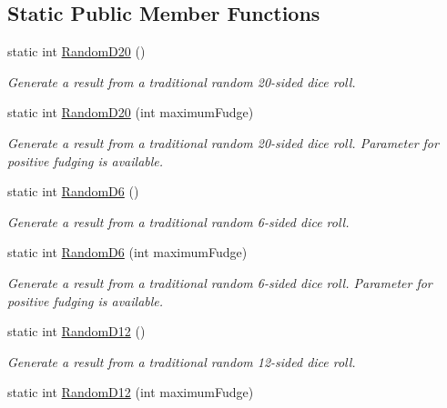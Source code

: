 \subsection*{Static Public Member Functions}
\begin{DoxyCompactItemize}
\item 
static int \mbox{\hyperlink{class_bigfoot_d_s_1_1_bigfoot_dice_and_coins_aad9d7b91f049e912555cb199bc66d0d7}{Random\+D20}} ()
\begin{DoxyCompactList}\small\item\em Generate a result from a traditional random 20-\/sided dice roll. \end{DoxyCompactList}\item 
static int \mbox{\hyperlink{class_bigfoot_d_s_1_1_bigfoot_dice_and_coins_a7ad023ef095ad98f7d38c5b0234f2555}{Random\+D20}} (int maximum\+Fudge)
\begin{DoxyCompactList}\small\item\em Generate a result from a traditional random 20-\/sided dice roll. Parameter for positive fudging is available. \end{DoxyCompactList}\item 
static int \mbox{\hyperlink{class_bigfoot_d_s_1_1_bigfoot_dice_and_coins_a20ea91b7328f0a2b36e5992ee9a0ccbb}{Random\+D6}} ()
\begin{DoxyCompactList}\small\item\em Generate a result from a traditional random 6-\/sided dice roll. \end{DoxyCompactList}\item 
static int \mbox{\hyperlink{class_bigfoot_d_s_1_1_bigfoot_dice_and_coins_aa9c2e1c718f8bd992bcd0cf9db877133}{Random\+D6}} (int maximum\+Fudge)
\begin{DoxyCompactList}\small\item\em Generate a result from a traditional random 6-\/sided dice roll. Parameter for positive fudging is available. \end{DoxyCompactList}\item 
static int \mbox{\hyperlink{class_bigfoot_d_s_1_1_bigfoot_dice_and_coins_a76b2cdf34cf16d0d6111c4fa1fee99aa}{Random\+D12}} ()
\begin{DoxyCompactList}\small\item\em Generate a result from a traditional random 12-\/sided dice roll. \end{DoxyCompactList}\item 
static int \mbox{\hyperlink{class_bigfoot_d_s_1_1_bigfoot_dice_and_coins_ade21521b65ed17ec599752440894da3c}{Random\+D12}} (int maximum\+Fudge)

\end{DoxyCompactItemize}
